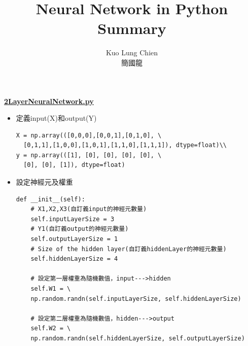 \documentclass[12pt, a4paper]{article}
\title{Neural Network in Python Summary}
\author{Kuo Lung Chien\\簡國龍}
\begin{document}
\maketitle

\textbf{\href{https://www.notion.so/codes-40723150-80bd6b7f30e4423f950a04f4447a70ab}{\underline{2LayerNeuralNetwork.py}}}
\begin{itemize}
\item 定義input(X)和output(Y)\\
\begin{lstlisting}
X = np.array(([0,0,0],[0,0,1],[0,1,0], \
  [0,1,1],[1,0,0],[1,0,1],[1,1,0],[1,1,1]), dtype=float)\\
y = np.array(([1], [0], [0], [0], [0], \
  [0], [0], [1]), dtype=float)
\end{lstlisting}
\end{itemize}

\begin{itemize}
\item 設定神經元及權重\\
\begin{lstlisting}
def __init__(self):
    # X1,X2,X3(自訂義input的神經元數量)
    self.inputLayerSize = 3
    # Y1(自訂義output的神經元數量)   
    self.outputLayerSize = 1
    # Size of the hidden layer(自訂義hiddenLayer的神經元數量)          
    self.hiddenLayerSize = 4 
        
    # 設定第一層權重為隨機數值，input--->hidden
    self.W1 = \
    np.random.randn(self.inputLayerSize, self.hiddenLayerSize)
        
    # 設定第二層權重為隨機數值，hidden--->output
    self.W2 = \
    np.random.randn(self.hiddenLayerSize, self.outputLayerSize)
\end{lstlisting}
\end{itemize}
\end{document}
